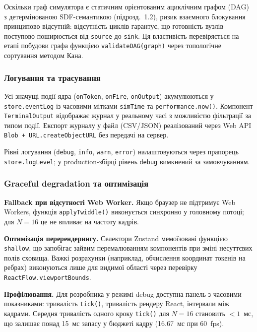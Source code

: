 Оскільки граф симулятора є статичним орієнтованим ациклічним
графом (DAG) з детермінованою SDF-семантикою (підрозд.~1.2), ризик
взаємного блокування принципово відсутній: відсутність циклів
гарантує, що готовність вузлів поступово поширюється від
\texttt{source} до \texttt{sink}. Ця властивість перевіряється на
етапі побудови графа функцією \texttt{validateDAG(graph)} через
топологічне сортування методом Кана.

\subsubsection*{Логування та трасування}

Усі значущі події ядра (\texttt{onToken}, \texttt{onFire},
\texttt{onOutput}) акумулюються у \texttt{store.eventLog} із
часовими мітками \texttt{simTime} та \texttt{performance.now()}.
Компонент \texttt{TerminalOutput} відображає журнал у реальному
часі з можливістю фільтрації за типом події. Експорт журналу у
файл (CSV/JSON) реалізований через Web API
\texttt{Blob + URL.createObjectURL} без передачі на сервер.

Рівні логування (\texttt{debug}, \texttt{info}, \texttt{warn},
\texttt{error}) налаштовуються через прапорець
\texttt{store.logLevel}; у production-збірці рівень
\texttt{debug} вимкнений за замовчуванням.

\subsubsection*{Graceful degradation та оптимізація}

\textbf{Fallback при відсутності Web Worker.} Якщо браузер не
підтримує Web Workers, функція \texttt{applyTwiddle()} виконується
синхронно у головному потоці; для $N = 16$ це не впливає на
частоту кадрів.

\textbf{Оптимізація перерендерингу.} Селектори Zustand
мемоїзовані функцією \texttt{shallow}, що запобігає зайвим
перемалюванням компонентів при зміні несуттєвих полів сховища.
Важкі розрахунки (наприклад, обчислення координат токенів на
ребрах) виконуються лише для видимої області через перевірку
\texttt{ReactFlow.viewportBounds}.

\textbf{Профілювання.} Для розробника у режимі debug доступна панель
з часовими показниками: тривалість \texttt{tick()}, тривалість
рендеру React, інтервали між кадрами. Середня тривалість одного
кроку \texttt{tick()} для $N = 16$ становить $< 1$~мс, що залишає
понад 15~мс запасу у бюджеті кадру (16.67~мс при 60~fps).


